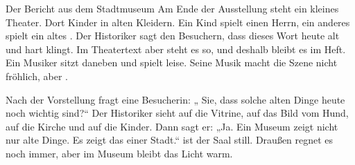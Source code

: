 \documentclass[12pt]{nextbook}
\begin{document}
\begin{readersection}{Der Bericht aus dem Stadtmuseum}
Am Ende der Ausstellung steht ein kleines Theater. Dort  Kinder in alten Kleidern. Ein Kind spielt einen Herrn, ein anderes spielt ein altes . Der Historiker sagt den Besuchern, dass dieses Wort heute alt und hart klingt. Im Theatertext aber steht es so, und deshalb bleibt es im Heft. Ein  Musiker sitzt daneben und spielt leise. Seine Musik macht die Szene nicht fröhlich, aber .

Nach der Vorstellung fragt eine Besucherin: „ Sie, dass solche alten Dinge heute noch wichtig sind?“ Der Historiker sieht auf die Vitrine, auf das Bild vom Hund, auf die Kirche und auf die Kinder. Dann sagt er: „Ja. Ein Museum zeigt nicht nur alte Dinge. Es zeigt das  einer Stadt.“  ist der Saal still. Draußen regnet es noch immer, aber im Museum bleibt das Licht warm.

\end{readersection}
\end{document}
